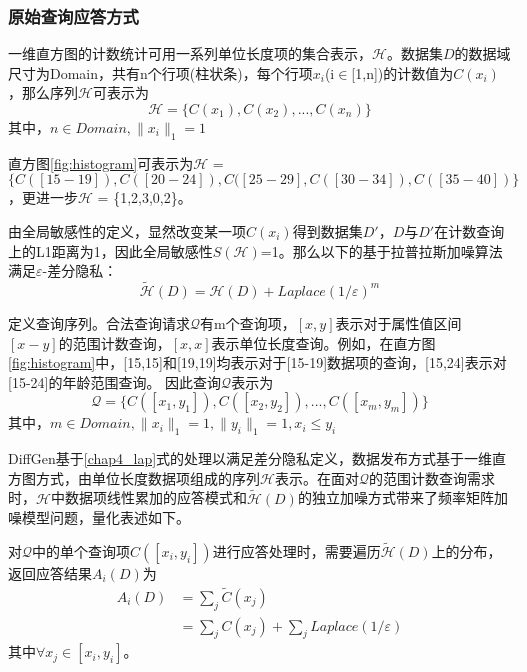 \subsubsection{原始查询应答方式}
一维直方图的计数统计可用一系列单位长度项的集合表示，$\mathcal{H}$。数据集$D$的数据域尺寸为Domain，共有n个行项(柱状条)，每个行项$x_{i}$(i$\in$[1,n])的计数值为$C(x_{i})$，那么序列$\mathcal{H}$可表示为
\begin{equation*}
	\mathcal{H} = \{C(x_{1}),C(x_{2}),...,C(x_{n})\}
\end{equation*}
其中，$n \in Domain,\|x_{i}\|_{1} = 1$

\begin{exmp}
	\label{chap4_exmp}
	直方图\ref{fig:histogram}可表示为$\mathcal{H}$ = $\{C([15-19]),C([20-24]),C([25-29],C([30-34]),C([35-40])\}$，更进一步$\mathcal{H}$ = \{1,2,3,0,2\}。
\end{exmp}

由全局敏感性的定义，显然改变某一项$C(x_{i})$得到数据集$D'$，$D$与$D'$在计数查询上的L1距离为1，因此全局敏感性$S(\mathcal{H})$=1。那么以下的基于拉普拉斯加噪算法满足$\varepsilon$-差分隐私：
\begin{equation}
	\label{chap4_lap}
	\widetilde{\mathcal{H}}(D) = \mathcal{H}(D) + \textit{Laplace}(1/\varepsilon)^m
\end{equation}

定义查询序列。合法查询请求$\mathcal{Q}$有m个查询项，$[x,y]$表示对于属性值区间$[x-y]$的范围计数查询，$[x,x]$表示单位长度查询。例如，在直方图\ref{fig:histogram}中，[15,15]和[19,19]均表示对于[15-19]数据项的查询，[15,24]表示对[15-24]的年龄范围查询。
因此查询$\mathcal{Q}$表示为
\[
	 \mathcal{Q} = \{C([x_{1},y_{1}]),C([x_{2},y_{2}]),...,C([x_{m},y_{m}])\}
\]
其中，$m \in Domain,\|x_{i}\|_{1} = 1, \|y_{i}\|_{1} = 1, x_{i} \leqslant y_{i}$

DiffGen基于\ref{chap4_lap}式的处理以满足差分隐私定义，数据发布方式基于一维直方图方式，由单位长度数据项组成的序列$\mathcal{H}$表示。在面对$\mathcal{Q}$的范围计数查询需求时，$\mathcal{H}$中数据项线性累加的应答模式和$\widetilde{\mathcal{H}}(D)$的独立加噪方式带来了频率矩阵加噪模型问题，量化表述如下。

对$\mathcal{Q}$中的单个查询项$C([x_{i},y_{i}])$进行应答处理时，需要遍历$\widetilde{\mathcal{H}}(D)$上的分布，返回应答结果$A_{i}(D)$为
\begin{equation}
\label{chap4_answer}
\begin{split}
	A_{i}(D) &= \sum\limits_j \widetilde{C}(x_{j})\\
			 &= \sum\limits_j C(x_{j}) + \sum\limits_j \textit{Laplace}(1/\varepsilon)
\end{split}	
\end{equation}
其中$ \forall x_{j} \in [x_{i},y_{i}]$。

